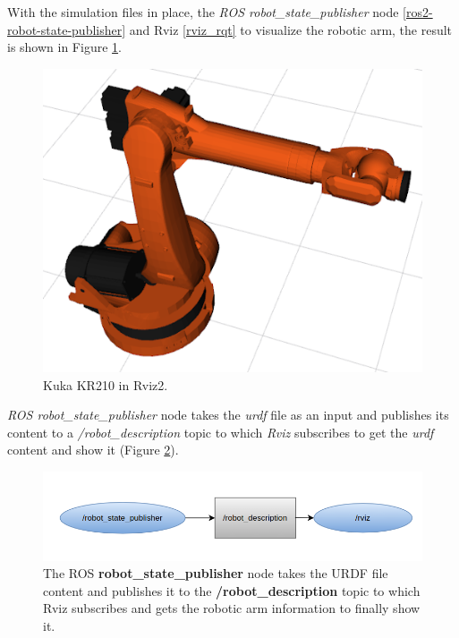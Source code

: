 \documentclass[12pt,oneside]{article}
\begin{document}
With the simulation files in place, the \textit{ROS robot\_state\_publisher} node \ref{ros2-robot-state-publisher} and Rviz \ref{rviz_rqt} to visualize the robotic arm, the result is shown in Figure \ref{fig:kuka1}.
\begin{figure}[H]
	\centering
	\includegraphics[width=0.7\linewidth]{kuka1}
	\caption[Rviz2 kuka]{Kuka KR210 in Rviz2.}
	\label{fig:kuka1}
\end{figure}

\textit{ROS robot\_state\_publisher} node takes the \textit{urdf} file as an input and publishes its content to a \textit{/robot\_description} topic to which \textit{Rviz} subscribes to get the \textit{urdf} content and show it (Figure \ref{fig:rosgraph1}). 

\begin{figure}[H]
\centering
\includegraphics[width=0.9\linewidth]{rosgraph1}
\caption{The ROS \textbf{robot\_state\_publisher} node takes the URDF file content and publishes it to the \textbf{/robot\_description} topic to which Rviz subscribes and gets the robotic arm information to finally show it.}
\label{fig:rosgraph1}
\end{figure}
\end{document}
